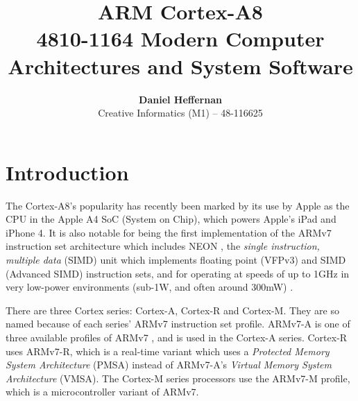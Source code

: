 \documentclass[oneside,a4paper]{report}
\title{ \textbf{ARM Cortex-A8} \\ \large{4810-1164 Modern Computer Architectures and System Software}}
\author{ \textbf{Daniel Heffernan} \\ Creative Informatics (M1) -- 48-116625 }
\begin{document}
\maketitle

\clearpage{}
\tableofcontents

\clearpage{}
\chapter{Introduction}

The Cortex-A8's popularity has recently been marked by its use by Apple as the CPU in the Apple A4 SoC (System on Chip), which powers Apple's iPad and iPhone 4. It is also notable for being the first implementation of the ARMv7 instruction set architecture which includes NEON \cite{Gris}, the \emph{single instruction, multiple data} (SIMD) unit which implements floating point (VFPv3) and SIMD (Advanced SIMD) instruction sets, and for operating at speeds of up to 1GHz in very low-power environments (sub-1W, and often around 300mW) \cite{Williamson}.

There are three Cortex series: Cortex-A, Cortex-R and Cortex-M. They are so named because of each series' ARMv7 instruction set profile. ARMv7-A is one of three available profiles of ARMv7 \cite[p. A1-4]{ARMRef}, and is used in the Cortex-A series. Cortex-R uses ARMv7-R, which is a real-time variant which uses a \emph{Protected Memory System Architecture} (PMSA) instead of ARMv7-A's \emph{Virtual Memory System Architecture} (VMSA). The Cortex-M series processors use the ARMv7-M profile, which is a microcontroller variant of ARMv7.
\end{document}
